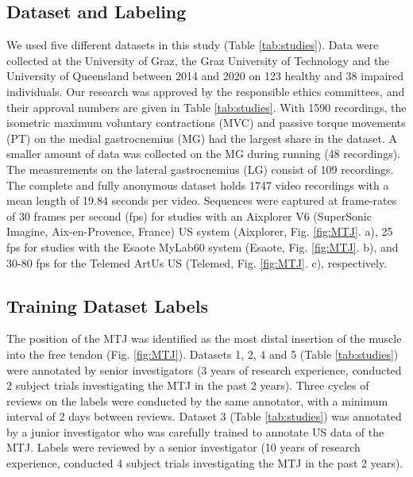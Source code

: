 \documentclass[journal,twoside,web]{ieeecolor}
\begin{document}
\subsection{Dataset and Labeling}
\label{sec:methods.data}
We used five different datasets in this study (Table \ref{tab:studies}). Data were collected at the University of Graz, the Graz University of Technology and the University of Queensland between 2014 and 2020 on 123 healthy and 38 impaired individuals. Our research was approved by the responsible ethics committees, and their approval numbers are given in Table \ref{tab:studies}. With 1590 recordings, the isometric maximum voluntary contractions (MVC) and passive torque movements (PT) on the medial gastrocnemius (MG) had the largest share in the dataset. A smaller amount of data was collected on the MG during running (48 recordings). The measurements on the lateral gastrocnemius (LG) consist of 109 recordings. The complete and fully anonymous dataset holds 1747 video recordings with a mean length of 19.84 seconds per video. Sequences were captured at frame-rates of 30 frames per second (fps) for studies with an Aixplorer V6 (SuperSonic Imagine, Aix-en-Provence, France) US system (Aixplorer, Fig. \ref{fig:MTJ}. a), 25 fps for studies with the Esaote MyLab60 system (Esaote, Fig. \ref{fig:MTJ}. b), and 30-80 fps for the Telemed ArtUs US (Telemed, Fig. \ref{fig:MTJ}. c), respectively.

\subsection*{Training Dataset Labels}
The position of the MTJ was identified as the most distal insertion of the muscle into the free tendon (Fig. \ref{fig:MTJ}). Datasets 1, 2, 4 and 5 (Table \ref{tab:studies}) were annotated by senior investigators (3 years of research experience, conducted 2 subject trials investigating the MTJ in the past 2 years). Three cycles of reviews on the labels were conducted by the same annotator, with a minimum interval of 2 days between reviews. Dataset 3 (Table \ref{tab:studies}) was annotated by a junior investigator who was carefully trained to annotate US data of the MTJ. Labels were reviewed by a senior investigator (10 years of research experience, conducted 4 subject trials investigating the MTJ in the past 2 years).
\end{document}
